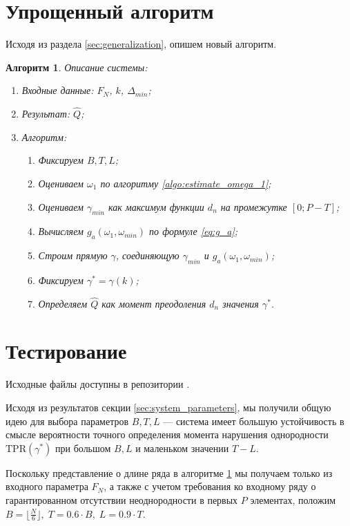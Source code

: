 \documentclass[specialist, substylefile = spbu.rtx,
			   subf, href, 12pt]{disser}
\newtheorem{algorithm}{Алгоритм}
\begin{document}
\section{Упрощенный алгоритм}
Исходя из раздела \ref{sec:generalization}, опишем новый алгоритм.
\begin{algorithm}\label{algo:system_simplification}
	Описание системы:
	\begin{enumerate}
		\item Входные данные: $ F_N $, $ k $, $ \Delta_{min} $;
		\item Результат: $ \hat{Q}$;
		\item Алгоритм:
		\begin{enumerate}
			\item Фиксируем $ B, T, L $;
			\item Оцениваем $ \omega_1 $ по алгоритму \ref{algo:estimate_omega_1};
			\item Оцениваем $ \gamma_{min} $ как максимум функции $ d_n $ на промежутке $ [0; P - T] $;
			\item Вычисляем $ g_a(\omega_1, \omega_{min}) $ по формуле \eqref{eq:g_a};
			\item Строим прямую $ \gamma $, соединяющую $ \gamma_{min} $ и $ g_a(\omega_1, \omega_{min}) $;
			\item Фиксируем $ \gamma^* = \gamma(k) $;
			\item Определяем $ \hat{Q} $ как момент преодоления $ d_n $ значения $ \gamma^* $.
		\end{enumerate}
	\end{enumerate}
\end{algorithm}


\section{Тестирование}
Исходные файлы доступны в репозитории \cite{Kononykhin2022}.

Исходя из результатов секции \ref{sec:system_parameters}, мы получили общую идею для выбора параметров $ B, T, L $ --- система имеет большую устойчивость в смысле вероятности точного определения момента нарушения однородности $ \mathrm{TPR}(\gamma^*) $ при большом $ B, L $ и маленьком значении $ T - L $. 

Поскольку представление о длине ряда в алгоритме \ref{algo:system_simplification} мы получаем только из входного параметра $ F_N $, а также с учетом требования ко входному ряду о гарантированном отсутствии неоднородности в первых $ P $ элементах, положим $ B = \lfloor \frac{N}{6} \rfloor,\; T = 0.6 \cdot B,\; L = 0.9 \cdot T $.
\end{document}

